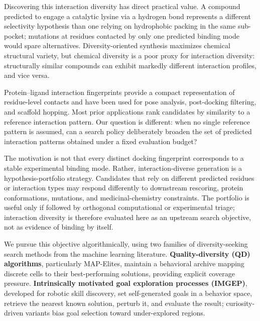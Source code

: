 \documentclass[journal=jcisd8,manuscript=article]{achemso}
\begin{document}
Discovering this interaction diversity has direct practical value. A compound predicted to engage a catalytic lysine via a hydrogen bond represents a different selectivity hypothesis than one relying on hydrophobic packing in the same sub-pocket; mutations at residues contacted by only one predicted binding mode would spare alternatives.\cite{diversity_drug_design} Diversity-oriented synthesis maximizes chemical structural variety,\cite{schreiber2000target} but chemical diversity is a poor proxy for interaction diversity: structurally similar compounds can exhibit markedly different interaction profiles, and vice versa.\cite{stumpfe2012activity}

Protein--ligand interaction fingerprints provide a compact representation of residue-level contacts and have been used for pose analysis, post-docking filtering, and scaffold hopping.\cite{deng2004sift,marcou2007mifp,da2014splif,venhorst2008scaffold,jasper2018padif} Most prior applications rank candidates by similarity to a reference interaction pattern. Our question is different: when no single reference pattern is assumed, can a search policy deliberately broaden the set of predicted interaction patterns obtained under a fixed evaluation budget?

The motivation is not that every distinct docking fingerprint corresponds to a stable experimental binding mode. Rather, interaction-diverse generation is a hypothesis-portfolio strategy. Candidates that rely on different predicted residues or interaction types may respond differently to downstream rescoring, protein conformations, mutations, and medicinal-chemistry constraints. The portfolio is useful only if followed by orthogonal computational or experimental triage; interaction diversity is therefore evaluated here as an upstream search objective, not as evidence of binding by itself.

We pursue this objective algorithmically, using two families of diversity-seeking search methods from the machine learning literature. \textbf{Quality-diversity (QD) algorithms}, particularly MAP-Elites,\cite{mouret2015illuminating,pugh2016qd} maintain a behavioral archive mapping discrete cells to their best-performing solutions, providing explicit coverage pressure. \textbf{Intrinsically motivated goal exploration processes (IMGEP)},\cite{baranes2013active,forestier2017intrinsically} developed for robotic skill discovery, set self-generated goals in a behavior space, retrieve the nearest known solution, perturb it, and evaluate the result; curiosity-driven variants bias goal selection toward under-explored regions.\cite{colas2022autotelic,etcheverry2020hierarchically}
\end{document}
